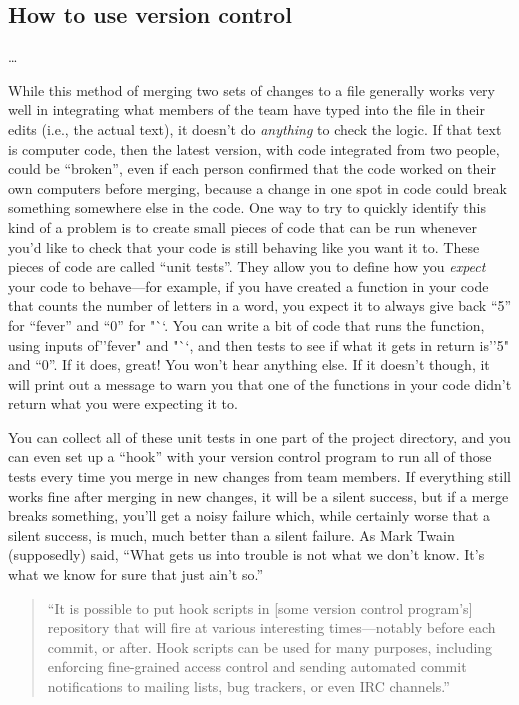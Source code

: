 \documentclass[]{tufte-book}
\begin{document}
\hypertarget{how-to-use-version-control}{%
\subsection{How to use version control}\label{how-to-use-version-control}}

\ldots{}

While this method of merging two sets of changes to a file generally works very well in
integrating what members of the team have typed into the file in their edits (i.e., the
actual text), it doesn't do \emph{anything} to check the logic. If that text is computer
code, then the latest version, with code integrated from two people, could be ``broken'',
even if each person confirmed that the code worked on their own computers before merging,
because a change in one spot in code could break something somewhere else in the code.
One way to try to quickly identify this kind of a problem is to create small pieces of
code that can be run whenever you'd like to check that your code is still behaving like you
want it to. These pieces of code are called ``unit tests''. They allow you to define how
you \emph{expect} your code to behave---for example, if you have created a function in your code that
counts the number of letters in a word, you expect it to always give back ``5'' for ``fever''
and ``0'' for "``. You can write a bit of code that runs the function, using inputs of''fever" and "``, and then tests to see if what it gets in return is''5" and ``0''. If it does,
great! You won't hear anything else. If it doesn't though, it will print out a message
to warn you that one of the functions in your code didn't return what you were expecting
it to.

You can collect all of these unit tests in one part of the project directory, and you
can even set up a ``hook'' with your version control program to run all of those tests
every time you merge in new changes from team members.
If everything still works fine after
merging in new changes, it will be a silent success, but if a merge breaks something,
you'll get a noisy failure which, while certainly worse that a silent success, is much,
much better than a silent failure. As Mark Twain (supposedly) said, ``What gets us into
trouble is not what we don't know. It's what we know for sure that just ain't so.''

\begin{quote}
``It is possible to put hook scripts in {[}some version control program's{]} repository
that will fire at various interesting times---notably before each commit, or after.
Hook scripts can be used for many purposes, including enforcing fine-grained access
control and sending automated commit notifications to mailing lists, bug trackers,
or even IRC channels.'' \citep{raymondunderstanding}
\end{quote}
\end{document}

